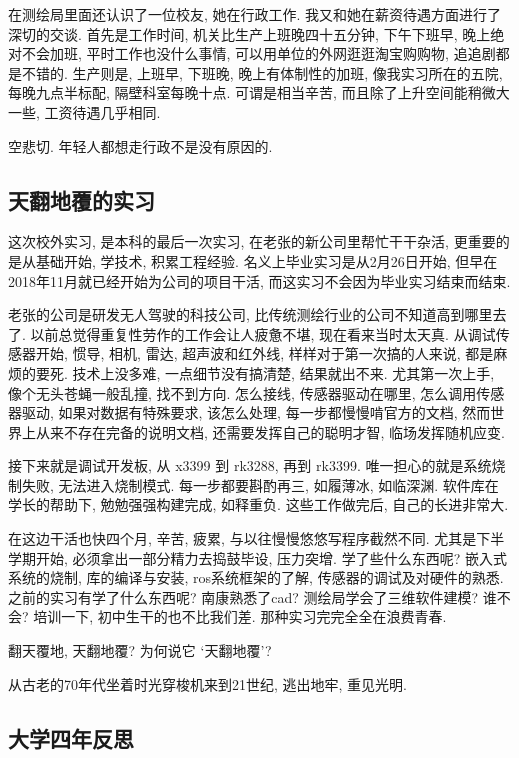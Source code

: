 \documentclass[a4paper, UTF8,  12pt]{article}
\begin{document}
在测绘局里面还认识了一位校友, 她在行政工作. 我又和她在薪资待遇方面进行了深切的交谈. 首先是工作时间, 机关比生产上班晚四十五分钟, 下午下班早, 晚上绝对不会加班, 平时工作也没什么事情, 可以用单位的外网逛逛淘宝购购物, 追追剧都是不错的. 生产则是, 上班早, 下班晚, 晚上有体制性的加班, 像我实习所在的五院, 每晚九点半标配, 隔壁科室每晚十点. 可谓是相当辛苦, 而且除了上升空间能稍微大一些, 工资待遇几乎相同. 

空悲切. 年轻人都想走行政不是没有原因的.

\subsection{天翻地覆的实习}

这次校外实习, 是本科的最后一次实习, 在老张的新公司里帮忙干干杂活, 更重要的是从基础开始, 学技术, 积累工程经验. 名义上毕业实习是从2月26日开始, 但早在2018年11月就已经开始为公司的项目干活, 而这实习不会因为毕业实习结束而结束.

老张的公司是研发无人驾驶的科技公司, 比传统测绘行业的公司不知道高到哪里去了. 以前总觉得重复性劳作的工作会让人疲惫不堪, 现在看来当时太天真. 从调试传感器开始, 惯导, 相机, 雷达, 超声波和红外线, 样样对于第一次搞的人来说, 都是麻烦的要死. 技术上没多难, 一点细节没有搞清楚, 结果就出不来. 尤其第一次上手, 像个无头苍蝇一般乱撞, 找不到方向. 怎么接线, 传感器驱动在哪里, 怎么调用传感器驱动, 如果对数据有特殊要求, 该怎么处理, 每一步都慢慢啃官方的文档, 然而世界上从来不存在完备的说明文档, 还需要发挥自己的聪明才智, 临场发挥随机应变.

接下来就是调试开发板, 从 x3399 到 rk3288, 再到 rk3399. 唯一担心的就是系统烧制失败, 无法进入烧制模式. 每一步都要斟酌再三, 如履薄冰, 如临深渊. 软件库在学长的帮助下, 勉勉强强构建完成, 如释重负. 这些工作做完后, 自己的长进非常大. 

在这边干活也快四个月, 辛苦, 疲累, 与以往慢慢悠悠写程序截然不同. 尤其是下半学期开始, 必须拿出一部分精力去捣鼓毕设, 压力突增. 学了些什么东西呢? 嵌入式系统的烧制, 库的编译与安装, ros系统框架的了解, 传感器的调试及对硬件的熟悉. 之前的实习有学了什么东西呢? 南康熟悉了cad? 测绘局学会了三维软件建模? 谁不会? 培训一下, 初中生干的也不比我们差. 那种实习完完全全在浪费青春. 

翻天覆地, 天翻地覆? 为何说它 \lq 天翻地覆\rq ? 

从古老的70年代坐着时光穿梭机来到21世纪, 逃出地牢, 重见光明. 

\subsection{大学四年反思}
\end{document}
